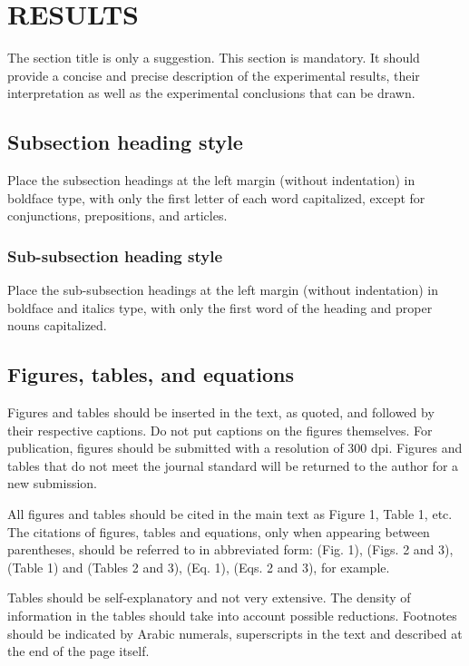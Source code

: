 \documentclass{BrJG_submit}
\begin{document}
\section*{RESULTS}
The section title is only a suggestion. This section is mandatory. It should provide a concise and precise description of the experimental results, their interpretation as well as the experimental conclusions that can be drawn.

\subsection*{Subsection heading style}
Place the subsection headings at the left margin (without indentation) in boldface type, with only the first letter of each word capitalized, except for conjunctions, prepositions, and articles.

\subsubsection*{Sub-subsection heading style}
Place the sub-subsection headings at the left margin (without indentation) in boldface and italics type, with only the first word of the heading and proper nouns capitalized.

\subsection*{Figures, tables, and equations}
Figures and tables should be inserted in the text, as quoted, and followed by their respective captions. Do not put captions on the figures themselves. For publication, figures should be submitted with a resolution of 300 dpi. Figures and tables that do not meet the journal standard will be returned to the author for a new submission.

All figures and tables should be cited in the main text as Figure 1, Table 1, etc. The citations of figures, tables and equations, only when appearing between parentheses, should be referred to in abbreviated form: (Fig. 1), (Figs. 2 and 3), (Table 1) and (Tables 2 and 3), (Eq. 1), (Eqs. 2 and 3), for example.

Tables should be self-explanatory and not very extensive. The density of information in the tables should take into account possible reductions. Footnotes should be indicated by Arabic numerals, superscripts in the text and described at the end of the page itself.
\end{document}
